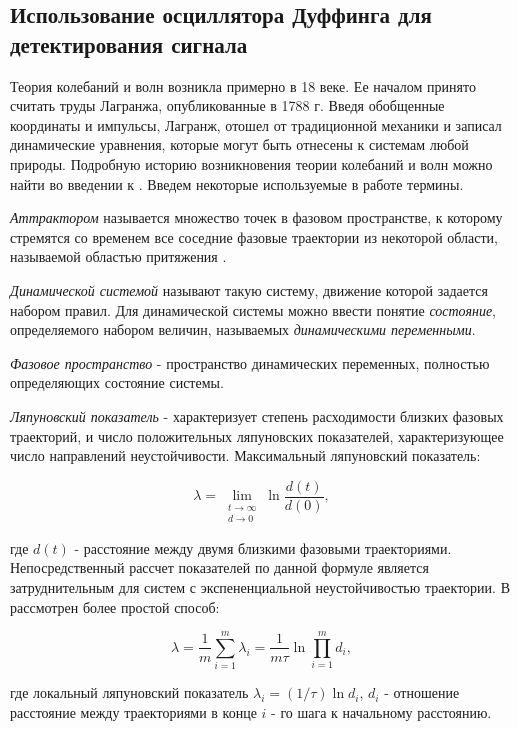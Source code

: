 \subsection{Использование осциллятора Дуффинга для детектирования сигнала}
Теория колебаний и волн возникла примерно в 18 веке. Ее началом принято считать труды Лагранжа, опубликованные в 1788 г. Введя обобщенные
координаты и импульсы, Лагранж, отошел от традиционной механики и записал динамические уравнения, которые могут быть отнесены к системам
любой природы. Подробную историю возникновения теории колебаний и волн можно найти во введении к \cite{landa_book}. 
Введем некоторые используемые в работе термины.

\emph{Аттрактором} называется множество точек в фазовом пространстве, к которому стремятся со
временем все соседние фазовые траектории из некоторой области, называемой областью притяжения \cite{landa_book}.

\emph{Динамической системой} называют такую систему, движение которой задается набором правил. Для динамической системы можно ввести
понятие \emph{состояние}, определяемого набором величин, называемых \emph{динамическими переменными}.

\emph{Фазовое пространство} - пространство динамических переменных, полностью определяющих состояние системы.

\emph{Ляпуновский показатель} - 
характеризует степень расходимости близких фазовых траекторий, и число положительных ляпуновских показателей, характеризующее число направлений
неустойчивости. Максимальный ляпуновский показатель:
\begin{center}
\begin{equation}
	\label{eq:exp_lyapunova_1}
	\lambda = \lim_{\substack{t \to \infty\\d \to 0}}\ln \frac{d(t)}{d(0)},
\end{equation}
\end{center}
где ${d(t)}$ - расстояние между двумя близкими фазовыми траекториями. Непосредственный рассчет показателей по данной формуле является
затруднительным для систем с экспененциальной неустойчивостью траектории. В \cite{landa_book} рассмотрен более простой способ:
\begin{center}
\begin{equation}
	\label{eq:exp_lyapunova_2}
	\lambda = \frac{1}{m}\sum \limits_{i=1}^m \lambda_i = \frac{1}{m\tau}\ln\prod \limits_{i=1}^md_i,
\end{equation}
\end{center}
где локальный ляпуновский показатель ${\lambda_i}=(1/ \tau)\ln d_i$, ${d_i}$ - отношение расстояние между траекториями в конце ${i}$ - го
шага к начальному расстоянию.

